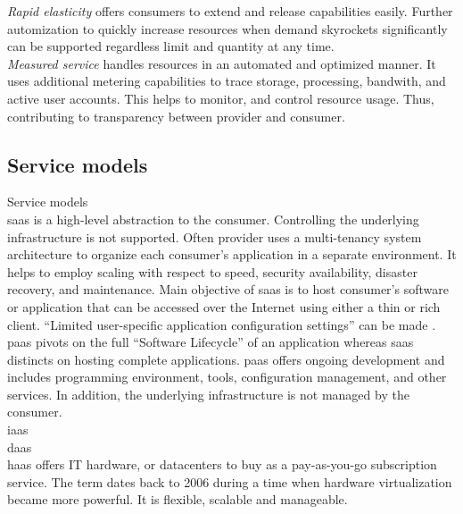 \textit{Rapid elasticity} offers consumers to extend and release capabilities easily. Further automization to quickly increase resources  when demand skyrockets significantly can be supported regardless limit and quantity at any time.\\

\textit{Measured service} handles resources in an automated and optimized manner. It uses additional metering capabilities to trace storage, processing, bandwith, and active user accounts. This helps to monitor, and control resource usage. Thus, contributing to transparency between provider and consumer.

\subsection{Service models}
\label{subsec:cloud-service}

Service models \\

\ac{saas} is a high-level abstraction to the consumer. Controlling the underlying infrastructure is not supported. Often provider uses a multi-tenancy system architecture to organize each consumer's application in a separate environment. It helps to employ scaling with respect to speed, security availability, disaster recovery, and maintenance. Main objective of \ac{saas} is to host consumer's software or application that can be accessed over the Internet using either a thin or rich client.\cite{Dillon2010} \enquote{Limited user-specific application configuration settings} can be made \cite{Mell2011}.\\

\ac{paas} pivots on the full \enquote{Software Lifecycle} of an application whereas \ac{saas} distincts on hosting complete applications. \ac{paas} offers ongoing development and includes programming environment, tools, configuration management, and other services. In addition, the underlying infrastructure is not managed by the consumer.\\

\ac{iaas}\\

\ac{daas}\\

\ac{haas} offers IT hardware, or datacenters to buy as a pay-as-you-go subscription service. The term dates back to 2006 during a time when hardware virtualization became more powerful. It is flexible, scalable and manageable. \cite{Wang2010}\\

